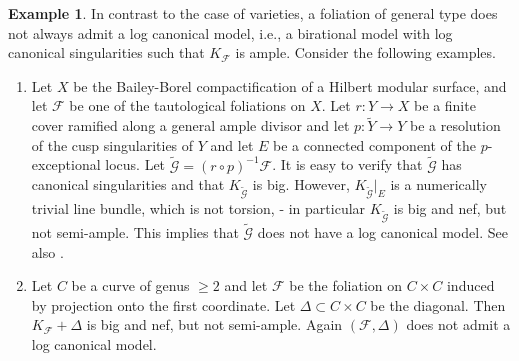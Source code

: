 \documentclass[12pt, a4paper]{amsart}
\newcounter{Theorem}
\theoremstyle{definition}
\newtheorem{ej}[theorem]{Example}
\theoremstyle{named}
\begin{document}
\begin{ej}
\label{not_ample_example}
    In contrast to the case of varieties, a foliation of general type does not always admit a log canonical model, i.e., a birational model with log canonical singularities such that $K_{\mathcal F}$ is ample.  Consider the following examples.

    \begin{enumerate}
        \item Let $X$ be the Bailey-Borel compactification of a Hilbert modular surface, and let $\mathcal F$ be one of the tautological foliations on $X$.  Let $r\colon Y \to X$ be a finite cover ramified along a general ample divisor and let $p\colon \tilde{Y} \to Y$ be a resolution of the cusp singularities of $Y$ and let $E$ be a connected component of the $p$-exceptional locus. 
Let $\tilde{\mathcal G} = (r \circ p)^{-1}\mathcal F$. It is easy to verify that $\tilde{\mathcal G}$ has canonical singularities and that $K_{\tilde{\mathcal G}}$
is big.  However, $K_{\tilde{\mathcal G}}\vert_E$ is a numerically trivial line bundle, which is not torsion, \cite[Theorem IV.2.2]{McQuillan08}- in particular $K_{\tilde{\mathcal G}}$ is big and nef, but not semi-ample.  This implies that $\tilde{\mathcal G}$ does not have a log canonical model.  See also \cite[Corollary IV.2.3]{McQuillan08}.

\item Let $C$ be a curve of genus $\ge 2$ and let $\mathcal F$ be the foliation on $C \times C$ induced by projection onto the first coordinate.  Let $\Delta \subset C \times C$ be the diagonal.  Then $K_{\mathcal F}+\Delta$
is big and nef, but not semi-ample.  Again 
$(\mathcal F, \Delta)$ does  not admit a log canonical model.
 

\end{enumerate}
\end{ej}
\end{document}
